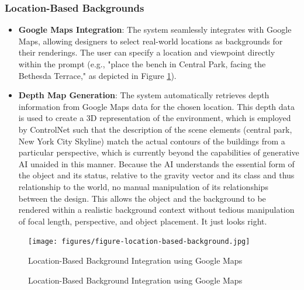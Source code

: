 \documentclass[12pt]{article}
\begin{document}
\subsubsection{Location-Based Backgrounds}
\begin{itemize}
\item \textbf{Google Maps Integration}: The system seamlessly integrates with Google Maps, allowing designers to select real-world locations as backgrounds for their renderings. The user can specify a location and viewpoint directly within the prompt (e.g., "place the bench in Central Park, facing the Bethesda Terrace," as depicted in Figure \ref{fig:location-based-background}).

\item \textbf{Depth Map Generation}: The system automatically retrieves depth information from Google Maps data for the chosen location. This depth data is used to create a 3D representation of the environment, which is employed by ControlNet such that the description of the scene elements (central park, New York City Skyline) match the actual contours of the buildings from a particular perspective, which is currently beyond the capabilities of generative AI unaided in this manner. Because the AI understands the essential form of the object and its status, relative to the gravity vector and its class and thus relationship to the world, no manual manipulation of its relationships between the design. This allows the object and the background to be rendered within a realistic background context without tedious manipulation of focal length, perspective, and object placement. It just looks right.
\end{itemize}

\begin{figure}[h]
    \centering
    \texttt{[image: figures/figure-location-based-background.jpg]}
    \caption{Location-Based Background Integration using Google Maps}
    \label{fig:location-based-background}
\end{figure}


\begin{figure}
\centering

\caption{Location-Based Background Integration using Google Maps}

\end{figure}
\end{document}

